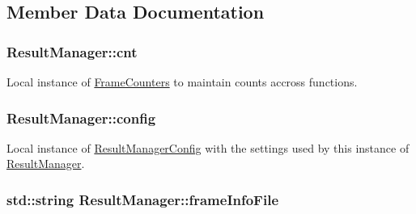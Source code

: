 \subsection{Member Data Documentation}
\subsubsection[{\texorpdfstring{cnt}{cnt}}]{ Result\+Manager\+::cnt\hspace{0.3cm}{\ttfamily [protected]}}\hypertarget{class_result_manager_ad5f8491ff6c6f2e1e78f04c537c9474d}{}\label{class_result_manager_ad5f8491ff6c6f2e1e78f04c537c9474d}


Local instance of \hyperlink{struct_result_manager_1_1_frame_counters}{Frame\+Counters} to maintain counts accross functions. 

\subsubsection[{\texorpdfstring{config}{config}}]{ Result\+Manager\+::config\hspace{0.3cm}{\ttfamily [protected]}}\hypertarget{class_result_manager_a23c07e2966ffb6b48c5c043418b4c748}{}\label{class_result_manager_a23c07e2966ffb6b48c5c043418b4c748}


Local instance of \hyperlink{struct_result_manager_config}{Result\+Manager\+Config} with the settings used by this instance of \hyperlink{class_result_manager}{Result\+Manager}. 

\subsubsection[{\texorpdfstring{frame\+Info\+File}{frameInfoFile}}]{\setlength{\rightskip}{0pt plus 5cm}std\+::string Result\+Manager\+::frame\+Info\+File\hspace{0.3cm}{\ttfamily [protected]}}\hypertarget{class_result_manager_a204b1725be212dbad21eea374420270f}{}\label{class_result_manager_a204b1725be212dbad21eea374420270f}



